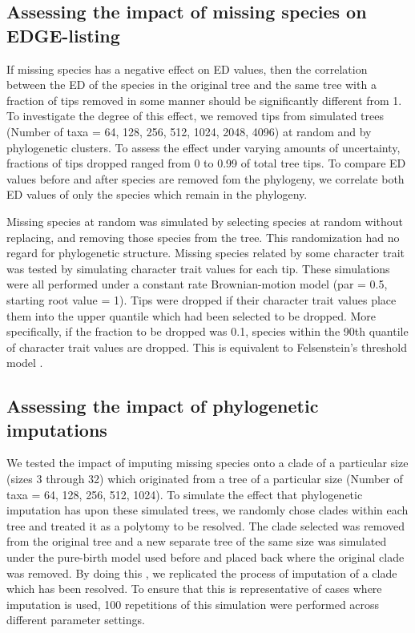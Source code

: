 \documentclass[12pt,english]{article}
\begin{document}
\subsection*{Assessing the impact of missing species on EDGE-listing}
If missing species has a negative effect on ED values, then the
correlation between the ED of the species in the original tree and the
same tree with a fraction of tips removed in some manner should be
significantly different from 1. To investigate the degree of this
effect, we removed tips from simulated trees (Number of taxa = 64,
128, 256, 512, 1024, 2048, 4096) at random and by phylogenetic
clusters. To assess the effect under varying amounts of uncertainty,
fractions of tips dropped ranged from 0 to 0.99 of total tree tips. 
To compare ED values before and after species are removed fom the 
phylogeny, we correlate both ED values of only the species 
which remain in the phylogeny. 

Missing species at random was simulated by selecting species at random
without replacing, and removing those species from the tree. This
randomization had no regard for phylogenetic structure. Missing
species related by some character trait was tested by simulating
character trait values for each tip. These simulations were all
performed under a constant rate Brownian-motion model (par = 0.5,
starting root value = 1). Tips were dropped if their character trait
values place them into the upper quantile which had been selected to
be dropped. More specifically, if the fraction to be dropped was 0.1,
species within the 90th quantile of character trait values are
dropped. This is equivalent to Felsenstein’s threshold model
\autocite{Felsenstein2004}.

\subsection*{Assessing the impact of phylogenetic imputations}
We tested the impact of imputing missing species onto a clade of a
particular size (sizes 3 through 32) which originated
from a tree of a particular size (Number of taxa = 64, 128, 256, 512,
1024). To simulate the effect that phylogenetic imputation has upon
these simulated trees, we randomly chose clades within each tree and
treated it as a polytomy to be resolved. The clade selected was
removed from the original tree and a new separate tree of the same
size was simulated under the pure-birth model used before and placed
back where the original clade was removed. By doing this , we
replicated the process of imputation of a clade which has been
resolved. To ensure that this is representative of cases where
imputation is used, 100 repetitions of this simulation were performed
across different parameter settings.
\end{document}
